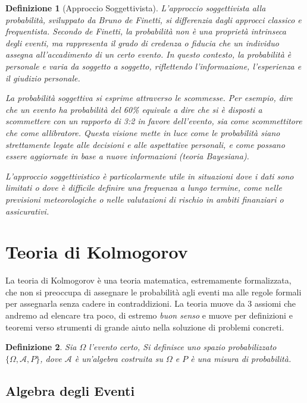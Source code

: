 \documentclass[
  11pt,
]{book}
\theoremstyle{mytheoremstyle}
\theoremstyle{mydefstyle}
\newtheorem{definition}{Definizione}[section]
\begin{document}
\begin{definition}[Approccio Soggettivista]
\leavevmode

L'approccio soggettivista alla probabilità, sviluppato da Bruno de
Finetti, si differenzia dagli approcci classico e frequentista. Secondo
de Finetti, la probabilità non è una proprietà intrinseca degli eventi,
ma rappresenta il grado di credenza o fiducia che un individuo assegna
all'accadimento di un certo evento. In questo contesto, la probabilità è
personale e varia da soggetto a soggetto, riflettendo l'informazione,
l'esperienza e il giudizio personale.

La probabilità soggettiva si esprime attraverso le scommesse. Per
esempio, dire che un evento ha probabilità del 60\% equivale a dire che
si è disposti a scommettere con un rapporto di 3:2 in favore
dell'evento, sia come scommettitore che come allibratore.
Questa visione mette in luce come le probabilità siano
strettamente legate alle decisioni e alle aspettative personali, e come
possano essere aggiornate in base a nuove informazioni (teoria
Bayesiana).

L'approccio soggettivistico è particolarmente utile in situazioni dove i
dati sono limitati o dove è difficile definire una frequenza a lungo
termine, come nelle previsioni meteorologiche o nelle valutazioni di
rischio in ambiti finanziari o assicurativi.

\end{definition}

\section{Teoria di Kolmogorov}\label{teoria-di-kolmogorov}

La teoria di Kolmogorov è una teoria matematica, estremamente
formalizzata, che non si preoccupa di assegnare le probabilità agli
eventi ma alle regole formali per assegnarla senza cadere in
contraddizioni. La teoria muove da 3 assiomi che andremo ad elencare tra
poco, di estremo \emph{buon senso} e muove per definizioni e teoremi verso
strumenti di grande aiuto nella soluzione di problemi concreti.

\begin{definition}
Sia \(\Omega\) l'evento certo, Si definisce uno spazio probabilizzato
\(\{\Omega,\mathscr{A},P\}\), dove \(\mathscr{A}\) è un'algebra costruita su
\(\Omega\) e \(P\) è una misura di probabilità.
\end{definition}

\subsection{Algebra degli Eventi}\label{algebra-degli-eventi-1}
\end{document}
